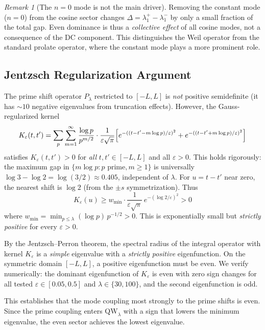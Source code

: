 \documentclass[12pt,a4paper]{article}
\theoremstyle{definition}
\theoremstyle{remark}
\newtheorem{remark}[theorem]{Remark}
\begin{document}
\begin{remark}[The $n=0$ mode is not the main driver]
Removing the constant mode ($n=0$) from the cosine sector changes $\Delta = \lambda_1^+ - \lambda_1^-$ by only a small fraction of the total gap. Even dominance is thus a \emph{collective effect} of all cosine modes, not a consequence of the DC component. This distinguishes the Weil operator from the standard prolate operator, where the constant mode plays a more prominent role.
\end{remark}

\subsection{Jentzsch Regularization Argument}

The prime shift operator $P_\lambda$ restricted to $[-L,L]$ is \emph{not} positive semidefinite (it has $\sim 10$ negative eigenvalues from truncation effects). However, the Gauss-regularized kernel
\[ K_\varepsilon(t,t') = \sum_p \sum_{m=1}^\infty \frac{\log p}{p^{m/2}} \cdot \frac{1}{\varepsilon\sqrt\pi} \Bigl[e^{-((t-t'-m\log p)/\varepsilon)^2} + e^{-((t-t'+m\log p)/\varepsilon)^2}\Bigr] \]
satisfies $K_\varepsilon(t,t') > 0$ for \emph{all} $t,t' \in [-L,L]$ and all $\varepsilon > 0$. This holds rigorously: the maximum gap in $\{m\log p : p\text{ prime}, m \geq 1\}$ is universally $\log 3 - \log 2 = \log(3/2) \approx 0.405$, independent of $\lambda$. For $u = t-t'$ near zero, the nearest shift is $\log 2$ (from the $\pm s$ symmetrization). Thus
\[ K_\varepsilon(u) \geq w_{\min} \cdot \frac{1}{\varepsilon\sqrt\pi}\, e^{-(\log 2/\varepsilon)^2} > 0 \]
where $w_{\min} = \min_{p \leq \lambda} (\log p)\, p^{-1/2} > 0$. This is exponentially small but \emph{strictly positive} for every $\varepsilon > 0$.

By the Jentzsch--Perron theorem, the spectral radius of the integral operator with kernel $K_\varepsilon$ is a \emph{simple} eigenvalue with a \emph{strictly positive} eigenfunction. On the symmetric domain $[-L,L]$, a positive eigenfunction must be even. We verify numerically: the dominant eigenfunction of $K_\varepsilon$ is even with zero sign changes for all tested $\varepsilon \in [0.05, 0.5]$ and $\lambda \in \{30, 100\}$, and the second eigenfunction is odd.

This establishes that the mode coupling most strongly to the prime shifts is even. Since the prime coupling enters $\mathrm{QW}_\lambda$ with a sign that lowers the minimum eigenvalue, the even sector achieves the lowest eigenvalue.
\end{document}
